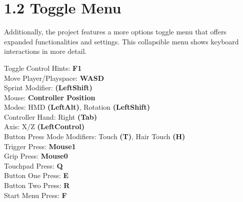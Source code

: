 \section{1.2 Toggle Menu}
Additionally, the project features a more options toggle menu that offers expanded functionalities and settings. This collapsible menu shows keyboard interactions in more detail.
\begin{center}
        {Toggle Control Hints:} \textbf{F1} \\
        {Move Player/Playspace:} \textbf{WASD} \\
        {Sprint Modifier:} \textbf{(LeftShift)} \\
        {Mouse:}\textbf{ Controller Position} \\
        {Modes:} HMD \textbf{(LeftAlt)}, Rotation \textbf{(LeftShift)} \\
        {Controller Hand:} Right \textbf{(Tab)} \\
        {Axis:} X/Z \textbf{(LeftControl)} \\
        {Button Press Mode Modifiers:} Touch \textbf{(T)}, Hair Touch \textbf{(H)} \\
        {Trigger Press:} \textbf{Mouse1} \\
        {Grip Press:} \textbf{Mouse0} \\
        {Touchpad Press:} \textbf{Q} \\
        {Button One Press:} \textbf{E} \\
        {Button Two Press:} \textbf{R} \\
        {Start Menu Press:} \textbf{F}
\end{center}